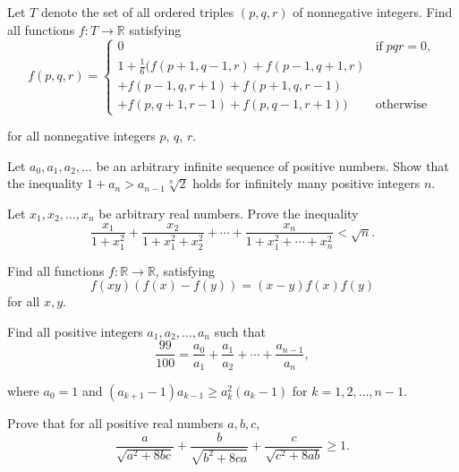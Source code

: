 \item[\textbf{A1.}]Let $ T$ denote the set of all ordered triples $ (p,q,r)$ of nonnegative integers. Find all functions $ f: T \rightarrow \mathbb{R}$ satisfying\[ f(p,q,r) = \begin{cases} 0 & \text{if} \; pqr = 0, \\
1 + \frac{1}{6}(f(p + 1,q - 1,r) + f(p - 1,q + 1,r) & \\
+ f(p - 1,q,r + 1) + f(p + 1,q,r - 1) & \\
 + f(p,q + 1,r - 1) + f(p,q - 1,r + 1)) & \text{otherwise} \end{cases}
\]

for all nonnegative integers $ p$,  $ q$,  $ r$.

\item[\textbf{A2.}]Let $a_0, a_1, a_2, \ldots$ be an arbitrary infinite sequence of positive numbers.  Show that the inequality $1 + a_n > a_{n-1} \sqrt[n]{2}$ holds for infinitely many positive integers $n$.

\item[\textbf{A3.}]Let $x_1,x_2,\ldots,x_n$ be arbitrary real numbers. Prove the inequality\[
\frac{x_1}{1+x_1^2} + \frac{x_2}{1+x_1^2 + x_2^2} + \cdots +
\frac{x_n}{1 + x_1^2 + \cdots + x_n^2} < \sqrt{n}.
\]

\item[\textbf{A4.}]Find all functions $f: \mathbb{R} \rightarrow \mathbb{R}$,  satisfying \[
f(xy)(f(x) - f(y)) = (x-y)f(x)f(y)
\] for all $x,y$.

\item[\textbf{A5.}]Find all positive integers $a_1, a_2, \ldots, a_n$ such that\[
\frac{99}{100} = \frac{a_0}{a_1} + \frac{a_1}{a_2} + \cdots +
\frac{a_{n-1}}{a_n},
\]

where $a_0 = 1$ and $(a_{k+1}-1)a_{k-1} \geq a_k^2(a_k - 1)$ for $k = 1,2,\ldots,n-1$.

\item[\textbf{A6.}]Prove that for all positive real numbers $a,b,c$,  \[ \frac{a}{\sqrt{a^2 + 8bc}} + \frac{b}{\sqrt{b^2 + 8ca}} + \frac{c}{\sqrt{c^2 + 8ab}} \geq 1.  \]